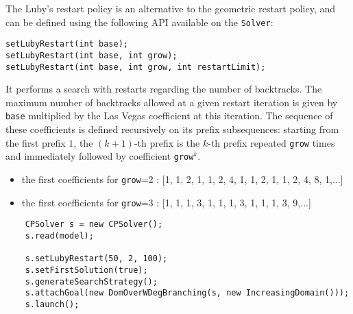 The Luby's restart policy is an alternative to the geometric restart policy, and can be defined 
using the following API available on the \texttt{Solver}:
\begin{lstlisting}
setLubyRestart(int base);
setLubyRestart(int base, int grow);
setLubyRestart(int base, int grow, int restartLimit);
\end{lstlisting}
It performs a search with restarts regarding the number of backtracks. 
The maximum number of backtracks allowed at a given restart iteration is given by \texttt{base} multiplied by the Las Vegas coefficient at this iteration. 
The sequence of these coefficients is defined recursively on its prefix subsequences: starting from the first prefix $1$, the $(k+1)$-th prefix is the $k$-th prefix repeated \texttt{grow} times and immediately followed by coefficient \texttt{grow}$^k$.
\begin{itemize}
	\item the first coefficients for \texttt{grow}=2 : [1, 1, 2, 1, 1, 2, 4, 1, 1, 2, 1, 1, 2, 4, 8, 1,...]
	\item the first coefficients for \texttt{grow}=3 : [1, 1, 1, 3, 1, 1, 1, 3, 1, 1, 1, 3, 9,...]
\end{itemize}

\begin{lstlisting}
	CPSolver s = new CPSolver();
	s.read(model);
	
	s.setLubyRestart(50, 2, 100);
	s.setFirstSolution(true);
	s.generateSearchStrategy();
	s.attachGoal(new DomOverWDegBranching(s, new IncreasingDomain()));
	s.launch();
\end{lstlisting}

